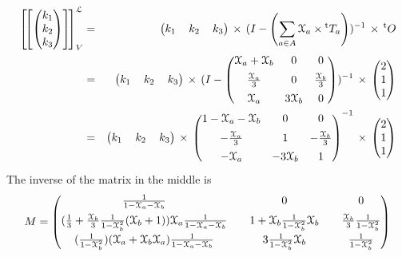 \documentclass[3p]{elsarticle}
\newcommand{\fL}{\mathcal{L}}    %
\newcommand{\streamproduct}{\times} %
\newcommand{\beh}[3]{\left[\!\left[ #1 \right]\!\right]^{#2}_{#3}} %
\newcommand{\transp}{{}^{\mathrm{t}}}  %
\begin{document}
\begin{eqnarray*}
\beh{\begin{pmatrix} k_1 \\ k_2 \\k_3
\end{pmatrix}}{\fL}{V} & = &
\begin{pmatrix}
k_1 \,  & k_2 \,  & k_3
\end{pmatrix}
\, \streamproduct \, (I - \left(\sum_{a\in A} \Xa \streamproduct
\transp{T_{a}}\right))^{-1} \, \streamproduct \, \transp{O}
\\
& = & \begin{pmatrix} k_1 \,  & k_2 \,  & k_3
\end{pmatrix}
\, \streamproduct \, (I -
\begin{pmatrix}
\Xa+\Xb & 0 & 0\\[1.1ex]
\frac{\Xa}{3} & 0 &\frac{\Xb}{3}\\[1.1ex]
\Xa & 3\Xb & 0\\
\end{pmatrix}
)^{-1} \, \streamproduct \, \begin{pmatrix} 2 \\ 1\\1
\end{pmatrix}
\\
& = & \begin{pmatrix} k_1 \,  & k_2 \,  & k_3
\end{pmatrix}
\, \streamproduct \,
\begin{pmatrix}
1-\Xa-\Xb & 0 & 0\\[1.1ex]
-\frac{\Xa}{3} & 1 &-\frac{\Xb}{3}\\[1.1ex]
-\Xa & -3\Xb & 1\\
\end{pmatrix}
^{-1} \, \streamproduct \, \begin{pmatrix} 2 \\ 1\\1
\end{pmatrix}
\\
\end{eqnarray*}
The inverse of the matrix in the middle is
\[
M = \begin{pmatrix}
\frac{1}{1-\mathcal{X}_a-\mathcal{X}_b} & 0 & 0\\[1.2ex]
(\frac 1 3+
\frac{\mathcal{X}_b}{3}\frac{1}{1-\mathcal{X}_b^2} (\mathcal{X}_b+1) ) \mathcal{X}_a\frac{1}{1-\mathcal{X}_a-\mathcal{X}_b} & \quad 1 +
\mathcal{X}_b\frac{1}{1-\mathcal{X}_b^2}\mathcal{X}_b \quad&\frac{\mathcal{X}_b}{3}\frac{1}{1-\mathcal{X}_b^2}\\[1.2ex]
(\frac{1}{1-\mathcal{X}_b^2}) (\mathcal{X}_a + \mathcal{X}_b \mathcal{X}_a)
\frac{1}{1-\mathcal{X}_a-\mathcal{X}_b}  & 3 \frac{1}{1-\mathcal{X}_b^2} \mathcal{X}_b & \frac{1}{1-\mathcal{X}_b^2}\\
\end{pmatrix}
\]
\end{document}
